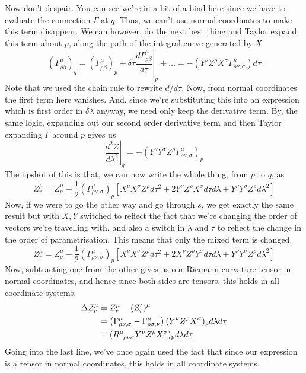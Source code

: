  Now don't despair. You can see we're in a bit of a bind here since 
 we have to evaluate the connection $ \Gamma $ at $ q $. Thus, 
 we can't use normal coordinates to make this term disappear. 
 We can however, do the next best thing and Taylor expand 
 this term about  $ p $, along the path of the integral curve 
 generated by $ X $
  \[
	  ( \Gamma^\mu_{ \rho \beta } ) _ q = ( \Gamma ^ \mu _{ \rho \beta } )_p + \delta \tau \left. \frac{d \Gamma ^ \mu _{ \rho \beta } }{  d \tau   } \right\vert_{ p} + \dots  = - ( Y ^ \nu Z ^ \rho X ^ \sigma \Gamma^\mu_{ \rho \nu , \sigma} ) d \tau 
	  \] Note that we used the
	  chain rule to rewrite $ d / d \tau $. Now, from normal coordinates the first term here vanishes. And, since we're substituting this into an expression which is first order in $ \delta \lambda $
	  anyway, we need only keep the derivative term.  By, the same 
	  logic, expanding out our second order derivative term 
	  and then Taylor expanding $ \Gamma $ around $ p $ gives
	  us 
\[
	\left. \frac{ d ^2 Z }{ d \lambda ^ 2  } \right\vert_{ q } = - ( Y ^ \nu Y ^ \sigma Z ^ \rho \Gamma^ \mu _{ \rho \nu, \sigma } )_p  
\] The upshot of this is that, 
we can now write the whole thing, from $ p $ to $ q $, 
as 
\[
	Z _ r ^\mu = Z _ p ^ \mu - \frac{1}{2 } ( \Gamma ^ \mu _{ \rho \nu , \sigma })_p \left[  X ^\nu X ^ \sigma Z ^ \rho d \tau ^ 2  + 2 Y ^ \nu Z ^ \rho 
	X ^ \sigma d \tau d \lambda + Y ^ \nu Y ^ \sigma Z ^ \rho d \lambda ^ 2\right] 
\] Now, if we were to go the other way and go through $s  $, 
we get exactly the same result but with $ X , Y $ switched 
to reflect the fact that we're changing the order of 
vectors we're travelling with, and also 
a switch in $ \lambda $ and $ \tau $ to reflect 
the change in the order of parametrisation.
This means that only the mixed term is changed. 
\[ 	Z _ r ^\mu = Z _ p ^ \mu - \frac{1}{2 } ( \Gamma ^ \mu _{ \rho \nu , \sigma })_p \left[  X ^\nu X ^ \sigma Z ^ \rho d \tau ^ 2  + 2 X ^ \nu Z ^ \rho 
	Y ^ \sigma d \tau d \lambda + Y ^ \nu Y ^ \sigma Z ^ \rho d \lambda ^ 2\right] 
\] Now, subtracting one from the other gives us our Riemann 
curvature tensor in normal coordinates, and hence since 
both sides are tensors, this holds in all coordinate systems. 
\begin{align*}
	\Delta Z ^ \mu _ r &=  Z _ r ^ \mu - ( Z _ r ' ) ^ \mu  \\
			   &=  \left(  \Gamma ^ \mu_{ \rho \nu , \sigma  }
			   - \Gamma ^ \mu_{ \rho \sigma , \nu } \right) ( Y^ \nu 
			   Z ^ \rho X ^ \sigma )_ p d \lambda d \tau  \\
			   &= ( R \indices{ ^ \mu _{ \rho \nu \sigma }} Y ^ \nu 
			   Z ^ \rho X ^ \sigma )_ p d \lambda  d \tau  \\
\end{align*} Going into the last line, 
we've once again used the fact that since our expression is a 
tensor in normal coordinates, this holds in all coordinate systems. 
